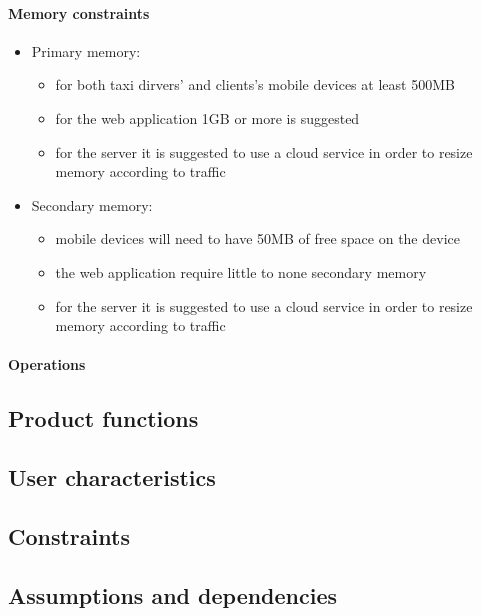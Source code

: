 \documentclass{article}
\begin{document}
\paragraph{Memory constraints} 
\begin{itemize}
	\item Primary memory:
		\begin{itemize}
			\item for both taxi dirvers' and clients's mobile devices at least 500MB 
			\item for the web application 1GB or more is suggested
			\item for the server it is suggested to use a cloud service in order to resize memory according to  traffic
		\end{itemize}
	\item Secondary memory:
		\begin{itemize}
			\item mobile devices will need to have 50MB of free space on the device
			\item the web application require little to none secondary memory
			\item for the server it is suggested to use a cloud service in order to resize memory according to traffic
		\end{itemize}
\end{itemize}
\paragraph{Operations} 

\subsection{Product functions}
\subsection{User characteristics}
\subsection{Constraints}
\subsection{Assumptions and dependencies}
\end{document}
